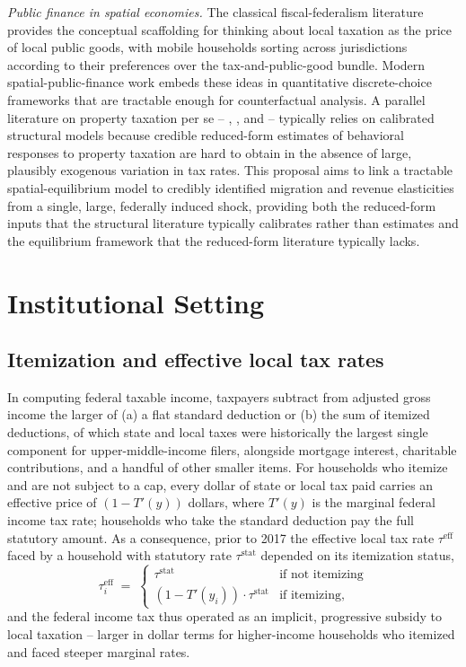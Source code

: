 \documentclass[12pt]{article}
\begin{document}
\textit{Public finance in spatial economies.} The classical fiscal-federalism literature \citep{Tiebout1956, Oates1972, Wilson1986} provides the conceptual scaffolding for thinking about local taxation as the price of local public goods, with mobile households sorting across jurisdictions according to their preferences over the tax-and-public-good bundle. Modern spatial-public-finance work \citep{Albouy2012, FajgelbaumGaubert, GaubertKlineVergaraYagan2025} embeds these ideas in quantitative discrete-choice frameworks that are tractable enough for counterfactual analysis. A parallel literature on property taxation per se -- \cite{coven_etal}, \cite{balke_etal}, and \cite{GieseckeMateen2022} -- typically relies on calibrated structural models because credible reduced-form estimates of behavioral responses to property taxation are hard to obtain in the absence of large, plausibly exogenous variation in tax rates. This proposal aims to link a tractable spatial-equilibrium model to credibly identified migration and revenue elasticities from a single, large, federally induced shock, providing both the reduced-form inputs that the structural literature typically calibrates rather than estimates and the equilibrium framework that the reduced-form literature typically lacks.


\section{Institutional Setting}

\subsection*{Itemization and effective local tax rates}

In computing federal taxable income, taxpayers subtract from adjusted gross income the larger of (a) a flat standard deduction or (b) the sum of itemized deductions, of which state and local taxes were historically the largest single component for upper-middle-income filers, alongside mortgage interest, charitable contributions, and a handful of other smaller items. For households who itemize and are not subject to a cap, every dollar of state or local tax paid carries an effective price of $(1 - T'(y))$ dollars, where $T'(y)$ is the marginal federal income tax rate; households who take the standard deduction pay the full statutory amount. As a consequence, prior to 2017 the effective local tax rate $\tau^{\text{eff}}$ faced by a household with statutory rate $\tau^{\text{stat}}$ depended on its itemization status,
\[
\tau^{\text{eff}}_i \;=\; \begin{cases} \tau^{\text{stat}} & \text{if not itemizing} \\ (1 - T'(y_i)) \cdot \tau^{\text{stat}} & \text{if itemizing,} \end{cases}
\]
and the federal income tax thus operated as an implicit, progressive subsidy to local taxation -- larger in dollar terms for higher-income households who itemized and faced steeper marginal rates.
\end{document}
